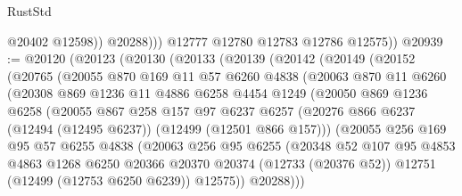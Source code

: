 \begin{lexlean}{RustStd}
\begin{coremodule}
{\begin{coremodule}
{{{{{{{{{{{{{{{{{{{{{{{{{{{{{{{{{{{{{{{{{{{{{{{{{{{{{{{{{{{{{{{{{{{{{{{{{{{{{{{{                  @20402
                  @12598))
              @20288)))
        @12777
        @12780
        @12783
        @12786
        @12575))
@20939 := @20120
    (@20123
      (@20130
        (@20133
          (@20139
            (@20142
              (@20149
                (@20152
                  (@20765
                    (@20055
                      @870
                      @169
                      @11
                      @57
                      @6260
                      @4838
                      (@20063
                        @870
                        @11
                        @6260
                        (@20308
                          @869
                          @1236
                          @11
                          @4886
                          @6258
                          @4454
                          @1249
                          (@20050
                            @869
                            @1236
                            @6258
                            (@20055
                              @867
                              @258
                              @157
                              @97
                              @6237
                              @6257
                              (@20276
                                @866
                                @6237
                                (@12494 (@12495 @6237))
                                (@12499 (@12501 @866 @157)))
                              (@20055
                                @256
                                @169
                                @95
                                @57
                                @6255
                                @4838
                                (@20063
                                  @256
                                  @95
                                  @6255
                                  (@20348
                                    @52
                                    @107
                                    @95
                                    @4853
                                    @4863
                                    @1268
                                    @6250
                                    @20366
                                    @20370
                                    @20374
                                    (@12733 (@20376 @52))
                                    @12751
                                    (@12499 (@12753 @6250 @6239))
                                    @12575))
                                @20288)))
}}}}}}}}}}}}}}}}}}}}}}}}}}}}}}}}}}}}}}}}}}}}}}}}}}}}}}}}}}}}}}}}}}}}}}}}}}}}}}}}
\end{coremodule}}
\end{coremodule}
\end{lexlean}
